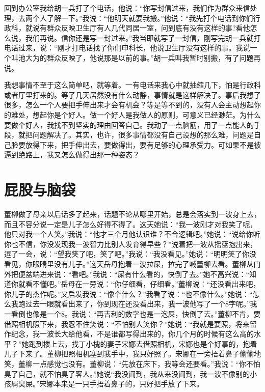 \documentclass[12pt,oneside]{book}
\begin{document}
回到办公室我给胡一兵打了个电话，他说：``你写封信过来，我们作为群众来信处理，去两个人了解一下。''我说：``他明天就要我搬。''他说：``我先打个电话到你们行政科，就说有群众反映卫生厅有人几代同居一室，问到底有没有这样的事?看他怎么说，我们再说。信你还是写一封过来。''我当即就写了一封信，刚写完胡一兵就打电话过来，说：``刚才打电话找了你们申科长，他说卫生厅没有这样的事。我说一个叫池大为的群众反映了，他说那是以前的事。''胡一兵叫我暂时别搬，有了问题再说。

我想事情不至于这么简单吧，就等着。一有电话来我心中就抽缩几下，怕是行政科或者厅里打来的。等了几天居然没有什么动静，事情就是这样解决了。事后我想了很多，怎么一个人要把手伸出来才会有机会？等是等不到的，没有人会主动想起你的难处，想起你是个好人。做一个好人是我做人的原则，可意义已经渺茫。为什么要做个好人，我找不到坚实的理由回答自己。我动了一点脑筋，用了一点能人的手段，就把问题解决了。其实，也许，很多事情都没有自己设想的那么难，问题是自己脸要放得下来，把手伸出去，要做得出，要有足够的心理承受力。可如果不是被逼到绝路上，我又怎么做得出那一种姿态？


\chapter{屁股与脑袋}

董柳做了母亲以后话多了起来，话题不论从哪里开始，总是会落实到一波身上去，而且不容分说一定是儿子怎么好得不得了。这天她说：``我一波刚才对我笑了呢，他只对我一个人笑。''我说：``他才三个月他认识谁？不合逻辑吧。''她说：``说给你听你也不信，你没发现我一波智力比别人发育得早些？''说着把一波从摇篮抱出来，逗了一会，说：``望我笑了吧，笑了吧。''我说：``我没看见。''她说：``明明笑了你没看见，你眼睛里没有儿子。''这天岳母抱着一波拉屎，拉完了喊董柳去看。董柳从门外把便盆端进来说：``看吧。''我说：``屎有什么看的，快倒了去。''她不高兴说：``知道你就看不懂吧。''岳母在一旁说：``你仔细看，仔细看。''董柳说：``还没看出来吧，你儿子的杰作呢。''又启发我说：``像个什么？''我看了说：``也不像什么。''她说：``怎么我跑过去一眼就看出来了，你到现在还没看出来，我一波他写了一个8字呢。''我一看倒也像是一个8。我说：``再吉利的数字也是一泡屎，快倒了去。''董柳不肯，要借照相机照下来，我忍不住笑说：``不怕别人笑你？''她说：``我就是要照，将来留作纪念，我一波长大给他看，不是谁都写得出来的，你几个月的时候有这么高的水平？''她跑到楼上去，找丁小槐的妻子宋娜去借照相机，宋娜也是个好事的，抱着儿子下来了。董柳把照相机塞到我手中，我只好照了。宋娜在一旁捂着鼻子偷偷地笑，董柳一点感觉也没有。董柳说：``先放在床下，我等会还要看。''我说：``你不怕臭了自己，就不怕臭了客人。''她说``我没闻到，我从来没闻到，我一波不像别的小孩屙臭屎。''宋娜本来是一只手捂着鼻子的，只好把手放了下来。
\end{document}
